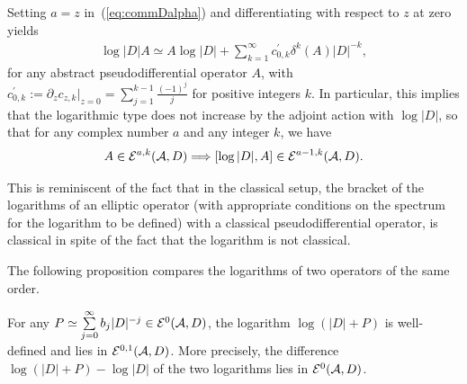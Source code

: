 \documentclass[pdftex]{sigma}
\numberwithin{equation}{section}
\begin{document}
 Setting $a=z$ in~(\ref{eq:commDalpha}) and dif\/ferentiating with respect to $z$
 at zero yields
\begin{gather*}  \log \vert D\vert   A\simeq A   \log \vert D\vert +
 \sum_{k=1}^\infty c^\prime_{0,k}
\delta^k(A)   \vert D\vert^{-k},
\end{gather*}
for any abstract pseudodif\/ferential operator $A$,
with
$c^\prime_{0, k}:=\partial_z c_{ z, k}\vert_{z=0}=
\sum\limits_{j=1}^{k-1}\frac{(-1)^j}{j}$ for positive integers $k$. In particular,
this implies that the logarithmic type does not increase
 by the adjoint action with $ \log \vert D\vert$,
 so that for any complex number $a$ and any integer $k$,  we have
\begin{gather}\label{eq:commDalphalog}
A\in {\cal E}^{a,k}({\cal A}, D)\Longrightarrow [ \log \vert D\vert,    A ]
\in {\cal E}^{a-1,k}({\cal A}, D).
\end{gather}
\begin{remark}
  This  is reminiscent of   the  fact that in the classical setup,
  the  bracket of the logarithms of an elliptic operator
   (with appropriate conditions on the spectrum for the logarithm to
    be def\/ined) with a classical pseudodif\/ferential operator, is
    classical in spite of the fact that the   logarithm is not classical.
    \end{remark}

     The following proposition compares  the logarithms
   of two operators of the  same order.
\begin{proposition}\label{prop:differencelog}
For any $P\simeq \sum\limits_{j=0}^\infty b_j   \vert D\vert^{-j}
\in {\cal E}^0({\cal A}, D)$, the logarithm $\log
  (\vert D\vert+P)$ is well-defined and  lies in
${\cal E}^{0,1}({\cal A}, D)$. More precisely, the difference
 $\log   (\vert D\vert+P) -\log  \vert D\vert $ of the
  two logarithms lies  in ${\cal E}^0({\cal A}, D)$.
\end{proposition}
\end{document}
